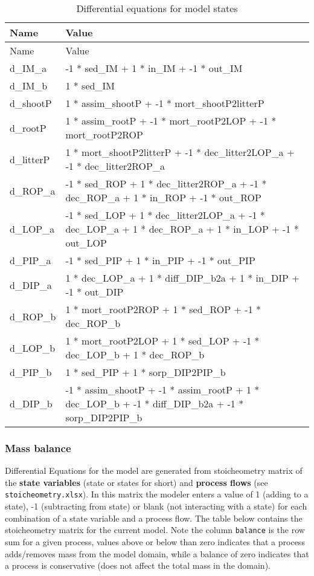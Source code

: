 \documentclass[
]{article}
\begin{document}
\begin{longtable}[]{@{}ll@{}}
\caption{Differential equations for model states}\tabularnewline
\toprule
Name & Value\tabularnewline
\midrule
\endfirsthead
\toprule
Name & Value\tabularnewline
\midrule
\endhead
d\_IM\_a & -1 * sed\_IM + 1 * in\_IM + -1 * out\_IM\tabularnewline
d\_IM\_b & 1 * sed\_IM\tabularnewline
d\_shootP & 1 * assim\_shootP + -1 * mort\_shootP2litterP\tabularnewline
d\_rootP & 1 * assim\_rootP + -1 * mort\_rootP2LOP + -1 *
mort\_rootP2ROP\tabularnewline
d\_litterP & 1 * mort\_shootP2litterP + -1 * dec\_litter2LOP\_a + -1 *
dec\_litter2ROP\_a\tabularnewline
d\_ROP\_a & -1 * sed\_ROP + 1 * dec\_litter2ROP\_a + -1 * dec\_ROP\_a +
1 * in\_ROP + -1 * out\_ROP\tabularnewline
d\_LOP\_a & -1 * sed\_LOP + 1 * dec\_litter2LOP\_a + -1 * dec\_LOP\_a +
1 * dec\_ROP\_a + 1 * in\_LOP + -1 * out\_LOP\tabularnewline
d\_PIP\_a & -1 * sed\_PIP + 1 * in\_PIP + -1 * out\_PIP\tabularnewline
d\_DIP\_a & 1 * dec\_LOP\_a + 1 * diff\_DIP\_b2a + 1 * in\_DIP + -1 *
out\_DIP\tabularnewline
d\_ROP\_b & 1 * mort\_rootP2ROP + 1 * sed\_ROP + -1 *
dec\_ROP\_b\tabularnewline
d\_LOP\_b & 1 * mort\_rootP2LOP + 1 * sed\_LOP + -1 * dec\_LOP\_b + 1 *
dec\_ROP\_b\tabularnewline
d\_PIP\_b & 1 * sed\_PIP + 1 * sorp\_DIP2PIP\_b\tabularnewline
d\_DIP\_b & -1 * assim\_shootP + -1 * assim\_rootP + 1 * dec\_LOP\_b +
-1 * diff\_DIP\_b2a + -1 * sorp\_DIP2PIP\_b\tabularnewline
\bottomrule
\end{longtable}

\hypertarget{mass-balance}{%
\subsubsection{Mass balance}\label{mass-balance}}

Differential Equations for the model are generated from stoicheometry
matrix of the \textbf{state variables} (state or states for short) and
\textbf{process flows} (see \texttt{stoicheometry.xlsx}). In this matrix
the modeler enters a value of 1 (adding to a state), -1 (subtracting
from state) or blank (not interacting with a state) for each combination
of a state variable and a process flow. The table below contains the
stoicheometry matrix for the current model. Note the column
\texttt{balance} is the row sum for a given process, values above or
below than zero indicates that a process adds/removes mass from the
model domain, while a balance of zero indicates that a process is
conservative (does not affect the total mass in the domain).
\end{document}
